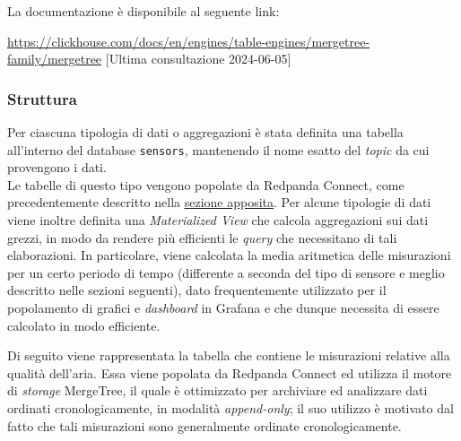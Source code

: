 La documentazione è disponibile al seguente link:
\begin{center}
	\url{https://clickhouse.com/docs/en/engines/table-engines/mergetree-family/mergetree} [Ultima consultazione 2024-06-05]
\end{center}

\subsubsection{Struttura}
Per ciascuna tipologia di dati o aggregazioni è stata definita una tabella all'interno del database \texttt{sensors}, mantenendo il nome esatto del \textit{topic}
da cui provengono i dati.\\
Le tabelle di questo tipo vengono popolate da Redpanda Connect, come precedentemente descritto nella \hyperref[redpanda_connect]{\underline{sezione apposita}}.
Per alcune tipologie di dati viene inoltre definita una \textit{Materialized View} che calcola aggregazioni sui dati grezzi,
in modo da rendere più efficienti le \textit{query} che necessitano di tali elaborazioni.
In particolare, viene calcolata la media aritmetica delle misurazioni per un certo periodo di tempo (differente a seconda del tipo di sensore e meglio descritto nelle sezioni seguenti),
dato frequentemente utilizzato per il popolamento di grafici e \textit{dashboard} in Grafana e che dunque necessita di essere calcolato in modo efficiente.

Di seguito viene rappresentata la tabella che contiene le misurazioni relative alla qualità dell'aria. Essa viene popolata da Redpanda Connect ed utilizza il motore di \textit{storage}
MergeTree, il quale è ottimizzato per archiviare ed analizzare dati ordinati cronologicamente, in modalità \textit{append-only}; il suo
utilizzo è motivato dal fatto che tali misurazioni sono generalmente ordinate cronologicamente.

